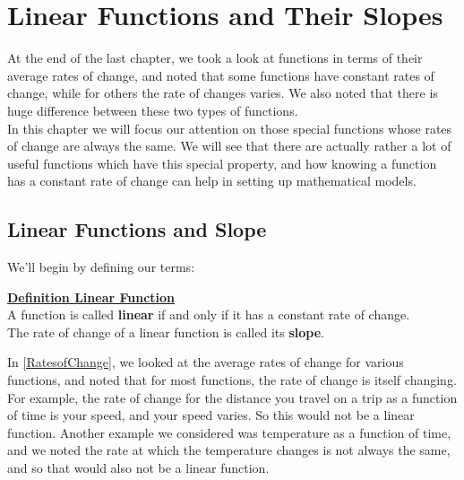 %
%

\section{Linear Functions and Their Slopes}
\label{LinearFunctionsandSlope}

At the end of the last chapter, we took a look at functions in terms of their average rates of change, and noted that some functions have constant rates of change, while for others the rate of changes varies. We also noted that there is huge difference between these two types of functions.\\

In this chapter we will focus our attention on those special functions whose rates of change are always the same. We will see that there are actually rather a lot of useful functions which have this special property, and how knowing a function has a constant rate of change can help in setting up mathematical models.

%
%

\subsection{Linear Functions and Slope}

We’ll begin by defining our terms:

\begin{definition}
	\textbf{\underline{Definition Linear Function}}\\
	\bigskip
	A function is called \textbf{linear} if and only if it has a constant rate of change.\\
	The rate of change of a linear function is called its \textbf{slope}.
\end{definition}

In \ref{RatesofChange}, we looked at the average rates of change for various functions, and noted that for most functions, the rate of change is itself changing. For example, the rate of change for the distance you travel on a trip as a function of time is your speed, and your speed varies. So this would not be a linear function. Another example we considered was temperature as a function of time, and we noted the rate at which the temperature changes is not always the same, and so that would also not be a linear function.\\


